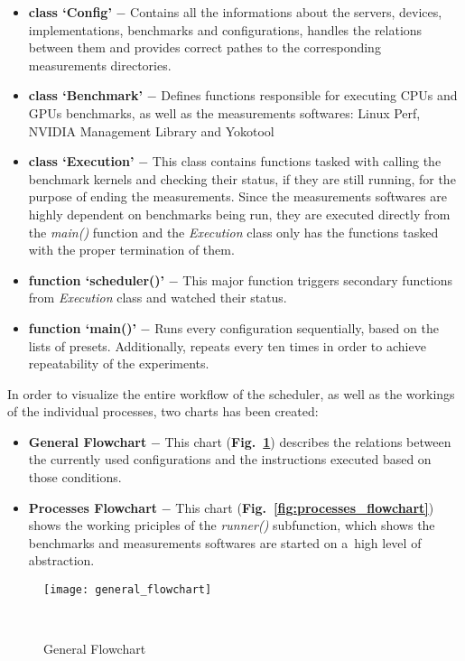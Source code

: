 \begin{itemize}
    \item \textbf{class `Config'} $-$ Contains all the informations about the servers,
    devices, implementations, benchmarks and configurations, handles the
    relations between them and provides correct pathes to the corresponding
    measurements directories.
    \item \textbf{class `Benchmark'} $-$ Defines functions responsible for
    executing CPUs and GPUs benchmarks, as well as the measurements
    softwares: Linux Perf, NVIDIA Management Library and Yokotool
    \item \textbf{class `Execution'} $-$ This class contains functions tasked with
    calling the benchmark kernels and checking their status, if they are still
    running, for the purpose of ending the measurements. Since the
    measurements softwares are highly dependent on benchmarks being run, they
    are executed directly from the \emph{main\@()} function and
    the \emph{Execution} class only has the functions tasked with the proper
    termination of them.
    \item \textbf{function `scheduler\@()'} $-$ This major function triggers
    secondary functions from \emph{Execution} class and watched their status.
    \item \textbf{function `main\@()'} $-$ Runs every configuration
    sequentially, based on the lists of presets. Additionally, repeats every
    ten times in order to achieve repeatability of the experiments.
\end{itemize}

In order to visualize the entire workflow of the scheduler, as well as the 
workings of the individual processes, two charts has been created:
\begin{itemize}
    \item \textbf{General Flowchart} $-$ This chart
    (\textbf{Fig.~\ref{fig:general_flowchart}}) describes the relations
    between the currently used configurations and the instructions executed
    based on those conditions.
    \item \textbf{Processes Flowchart} $-$ This chart
    (\textbf{Fig.~\ref{fig:processes_flowchart}}) shows the working priciples of the
    \emph{runner\@()} subfunction, which shows the benchmarks and measurements
    softwares are started on a~high level of abstraction.
\end{itemize}

\newpage

\begin{figure}[hbtp!]
    \centering
    \texttt{[image: general\_flowchart]}
    \caption{General Flowchart}~\label{fig:general_flowchart}
\end{figure}

